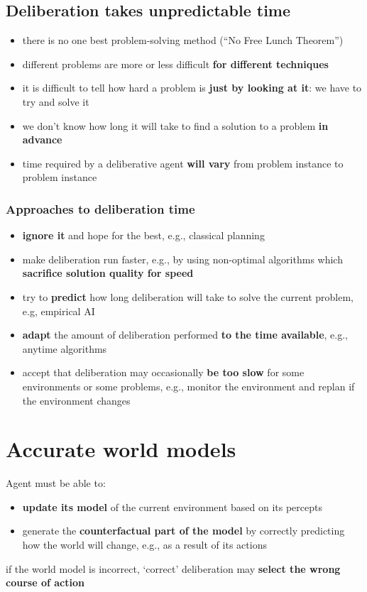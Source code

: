 \documentclass{article}
\begin{document}
\subsection{Deliberation takes unpredictable time}
\begin{itemize}
  \item there is no one best problem-solving method (“No Free Lunch Theorem”)
  \item different problems are more or less difficult \textbf{for different techniques}
  \item it is difficult to tell how hard a problem is \textbf{just by looking at it}: we have to try and solve it
  \item we don’t know how long it will take to find a solution to a problem \textbf{in advance}
  \item time required by a deliberative agent \textbf{will vary} from problem instance to problem instance
\end{itemize}

\subsubsection{Approaches to deliberation time}
\begin{itemize}
  \item \textbf{ignore it} and hope for the best, e.g., classical planning 
  \item make deliberation run faster, e.g., by using non-optimal algorithms which \textbf{sacrifice solution quality for speed} 
  \item try to \textbf{predict} how long deliberation will take to solve the current problem, e.g, empirical AI 
  \item \textbf{adapt} the amount of deliberation performed \textbf{to the time available}, e.g., anytime algorithms 
  \item accept that deliberation may occasionally \textbf{be too slow} for some environments or some problems, e.g., monitor the environment and replan if the environment changes
\end{itemize}


\section{Accurate world models}
\begin{flushleft}
Agent must be able to:
\begin{itemize}
  \item \textbf{update its model} of the current environment based on its percepts
  \item generate the \textbf{counterfactual part of the model} by correctly predicting how the world will change, e.g., as a result of its actions
\end{itemize}
if the world model is incorrect, ‘correct’ deliberation may \textbf{select the wrong course of action}
\end{flushleft}
\end{document}
